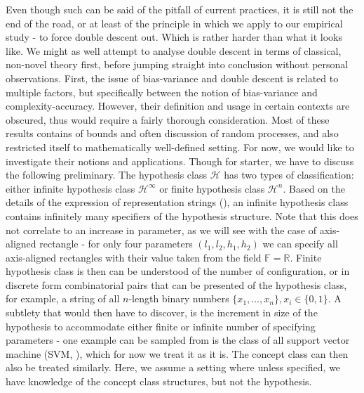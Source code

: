 Even though such can be said of the pitfall of current practices, it is still not the end of the road, or at least of the principle in which we apply to our empirical study - to force double descent out. Which is rather harder than what it looks like. We might as well attempt to analyse double descent in terms of classical, non-novel theory first, before jumping straight into conclusion without personal observations. First, the issue of bias-variance and double descent is related to multiple factors, but specifically between the notion of bias-variance and complexity-accuracy. However, their definition and usage in certain contexts are obscured, thus would require a fairly thorough consideration. Most of these results contains of bounds and often discussion of random processes, and also restricted itself to mathematically well-defined setting. For now, we would like to investigate their notions and applications. Though for starter, we have to discuss the following preliminary. The hypothesis class $\mathcal{H}$ has two types of classification: either infinite hypothesis class $\mathcal{H}^{\infty}$ or finite hypothesis class $\mathcal{H}^{n}$. Based on the details of the expression of representation strings (\cite{10.5555/200548}), an infinite hypothesis class contains infinitely many specifiers of the hypothesis structure. Note that this does not correlate to an increase in parameter, as we will see with the case of axis-aligned rectangle - for only four parameters $(l_{1},l_{2},h_{1},h_2)$ we can specify all axis-aligned rectangles with their value taken from the field $\mathbb{F}=\mathbb{R}$. Finite hypothesis class is then can be understood of the number of configuration, or in discrete form combinatorial pairs that can be presented of the hypothesis class, for example, a string of all $n$-length binary numbers $\{x_{1},\dots,x_{n}\}, x_{i}\in \{0,1\}$. A subtlety that would then have to discover, is the increment in size of the hypothesis to accommodate either finite or infinite number of specifying parameters - one example can be sampled from is the class of all support vector machine (SVM, \cite{Vapnik1999-VAPTNO}), which for now we treat it as it is. The concept class can then also be treated similarly. Here, we assume a setting where unless specified, we have knowledge of the concept class structures, but not the hypothesis. 

